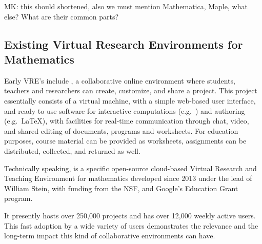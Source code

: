 


\begin{oldpart}{MK: this should shortened, also we must mention Mathematica, Maple, what
    else? What are their common parts?}
\subsection{Existing Virtual Research Environments for Mathematics}

  Early VRE's include \SMC, a collaborative online environment where students, teachers
  and researchers can create, customize, and share a project. This project essentially
  consists of a virtual machine, with a simple web-based user interface, and ready-to-use
  software for interactive computations (e.g.\ \Sage) and authoring (e.g.\ \LaTeX), with
  facilities for real-time communication through chat, video, and shared editing of
  documents, programs and worksheets.  For education purposes, course material can be
  provided as worksheets, assignments can be distributed, collected, and returned as well.

  Technically speaking, \SMC is a specific open-source cloud-based Virtual Research and
  Teaching Environment for mathematics developed since 2013 under the lead of William
  Stein, with funding from the NSF, and Google's Education Grant program.    

  It presently hosts over 250,000 projects and has over 12,000 weekly active users. This
  fast adoption by a wide variety of users demonstrates the relevance and the long-term
  impact this kind of collaborative environments can have.
\end{oldpart}




